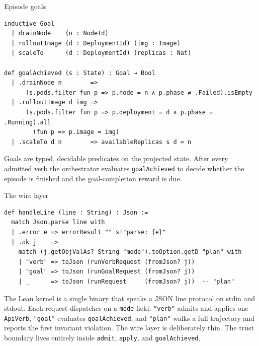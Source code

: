 \documentclass[10pt,aspectratio=169]{beamer}
\begin{document}
\begin{frame}[fragile]{Episode goals}
\begin{lstlisting}
inductive Goal
  | drainNode    (n : NodeId)
  | rolloutImage (d : DeploymentId) (img : Image)
  | scaleTo      (d : DeploymentId) (replicas : Nat)

def goalAchieved (s : State) : Goal → Bool
  | .drainNode n        =>
      (s.pods.filter fun p => p.node = n ∧ p.phase ≠ .Failed).isEmpty
  | .rolloutImage d img =>
      (s.pods.filter fun p => p.deployment = d ∧ p.phase = .Running).all
        (fun p => p.image = img)
  | .scaleTo d n        => availableReplicas s d = n
\end{lstlisting}
\vspace{0.4em}
\small Goals are typed, decidable predicates on the projected state. After every admitted verb the orchestrator evaluates \texttt{goalAchieved} to decide whether the episode is finished and the goal-completion reward is due.
\end{frame}

\begin{frame}[fragile]{The wire layer}
\begin{lstlisting}
def handleLine (line : String) : Json :=
  match Json.parse line with
  | .error e => errorResult "" s!"parse: {e}"
  | .ok j    =>
    match (j.getObjValAs? String "mode").toOption.getD "plan" with
    | "verb" => toJson (runVerbRequest (fromJson? j))
    | "goal" => toJson (runGoalRequest (fromJson? j))
    | _      => toJson (runRequest     (fromJson? j))  -- "plan"
\end{lstlisting}
\vspace{0.4em}
\small The Lean kernel is a single binary that speaks a JSON line protocol on stdin and stdout. Each request dispatches on a \texttt{mode} field: \texttt{"verb"} admits and applies one \texttt{ApiVerb}, \texttt{"goal"} evaluates \texttt{goalAchieved}, and \texttt{"plan"} walks a full trajectory and reports the first invariant violation. The wire layer is deliberately thin. The trust boundary lives entirely inside \texttt{admit}, \texttt{apply}, and \texttt{goalAchieved}.
\end{frame}
\end{document}

